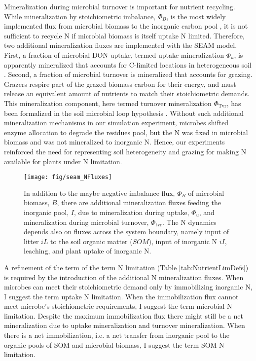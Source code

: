 Mineralization during microbial turnover is important for nutrient recycling.
While mineralization by stoichiometric imbalance, $\Phi_B$, is the most widely
implemented flux from microbial biomass to the inorganic carbon pool
\citep{Manzoni09}, it is not sufficient to recycle N if microbial biomass is
itself uptake N limited. Therefore, two additional mineralization fluxes are
implemented with the SEAM model. First, a fraction of microbial DON uptake,
termed uptake mineralization $\Phi_u$, is apparently mineralized that accounts for
C-limited locations in heterogeneous soil \citep{Manzoni08}.
Second, a fraction of microbial turnover is mineralized that accounts for
grazing. Grazers respire part of the grazed biomass carbon for their energy, and
must release an equivalent amount of nutrients to match their stoichiometric
demands. This mineralization component, here termed turnover mineralization
$\Phi_{\operatorname{Tvr}}$, has been formalized in the soil microbial loop
hypothesis \citep{Clarholm85, Raynaud06}. Without such additional mineralization
mechanisms in our simulation experiment, microbes shifted enzyme allocation to
degrade the residues pool, but the N was fixed in microbial biomass and was not
mineralized to inorganic N. Hence, our experiments reinforced the need for
representing soil heterogeneity and grazing for making N available for plants
under N limitation.

\begin{figure}[t] \vspace*{2mm}
\begin{center}
\texttt{[image: fig/seam\_NFluxes]} 
\end{center}
\caption{
In addition to the maybe negative imbalance flux, $\Phi_B$ of microbial
biomass, $B$, there are additional mineralization fluxes feeding the inorganic
pool, $I$, due to mineralization during uptake, $\Phi_u$, and mineralization
during microbial turnover, $\Phi_{\operatorname{tvr}}$. The N dynamics depends
also on fluxes across the system boundary, namely input of litter $iL$ to the
soil organic matter ($SOM$), input of inorganic N $iI$, leaching, and plant
uptake of inorganic N.
\label{fig:SEAMStructNFluxes}}
\end{figure}

A refinement of the term of the term N limitation (Table
\ref{tab:NutrientLimDefs}) is required by the introduction of the additional N
mineralization fluxes.
When microbes can meet their stoichiometric demand only by immobilizing
inorganic N, I suggest the term uptake N limitation.
When the immobilization flux cannot meet microbe's stoichiometric requirements,
I suggest the term microbial N limitation. Despite the maximum immobilization flux
there might still be a net mineralization due to uptake mineralization and turnover
mineralization.
When there is a net immobilization, i.e. a net transfer from inorganic pool to
the organic pools of SOM and microbial biomass, I suggest the term SOM N
limitation.


